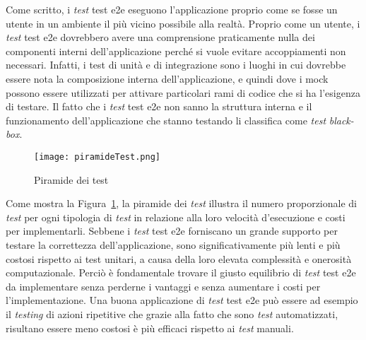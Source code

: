 Come scritto, i \emph{test} \gls{test e2e} eseguono l'applicazione proprio come se fosse un utente in un ambiente il più vicino possibile alla realtà. Proprio come un utente, i \emph{test} \gls{test e2e} dovrebbero avere una comprensione praticamente nulla dei componenti interni dell'applicazione perché si vuole evitare accoppiamenti non necessari. Infatti, i test di unità e di integrazione sono i luoghi in cui dovrebbe essere nota la composizione interna dell'applicazione, e quindi dove i mock possono essere utilizzati per attivare particolari rami di codice che si ha l'esigenza di testare. Il fatto che i \emph{test} \gls{test e2e} non sanno la struttura interna e il funzionamento dell'applicazione che stanno testando li classifica come \emph{test} \emph{black-box}.
\clearpage

\begin{figure}[!h] 
	\begin{center}
		\texttt{[image: piramideTest.png]}
		\caption{Piramide dei test}\label{fig:test}
	\end{center}
\end{figure}

Come mostra la Figura~\ref{fig:test}, la piramide dei \emph{test} illustra il numero proporzionale di \emph{test} per ogni tipologia di \emph{test} in relazione alla loro velocità d'esecuzione e costi per implementarli. Sebbene i \emph{test} \gls{test e2e} forniscano un grande supporto per testare la correttezza dell'applicazione, sono significativamente più lenti e più costosi rispetto ai test unitari, a causa della loro elevata complessità e onerosità computazionale. Perciò è fondamentale trovare il giusto equilibrio di \emph{test} \gls{test e2e} da implementare senza perderne i vantaggi e senza aumentare i costi per l'implementazione. Una buona applicazione di \emph{test} \gls{test e2e} può essere ad esempio il \emph{testing} di azioni ripetitive che grazie alla fatto che sono \emph{test} automatizzati, risultano essere meno costosi è più efficaci rispetto ai \emph{test} manuali.

